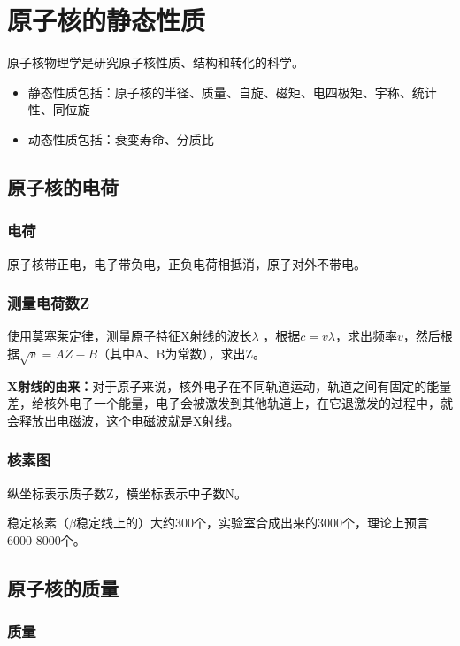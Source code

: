 \chapter{原子核的静态性质}

原子核物理学是研究原子核性质、结构和转化的科学。

\begin{itemize}
    \item 静态性质包括：原子核的半径、质量、自旋、磁矩、电四极矩、宇称、统计性、同位旋
    \item 动态性质包括：衰变寿命、分质比
\end{itemize}

\section{原子核的电荷} 

\subsection{电荷} 
 
原子核带正电，电子带负电，正负电荷相抵消，原子对外不带电。

\subsection{测量电荷数Z}

使用莫塞莱定律，测量原子特征X射线的波长$\lambda$ ，根据$c=v\lambda$，求出频率$v$，然后根据$\sqrt{v}=AZ-B$（其中A、B为常数），求出Z。

\textbf{X射线的由来：}对于原子来说，核外电子在不同轨道运动，轨道之间有固定的能量差，给核外电子一个能量，电子会被激发到其他轨道上，在它退激发的过程中，就会释放出电磁波，这个电磁波就是X射线。

\subsection{核素图}

纵坐标表示质子数Z，横坐标表示中子数N。

稳定核素（$\beta$稳定线上的）大约300个，实验室合成出来的3000个，理论上预言6000-8000个。

\section{原子核的质量}

\subsection{质量}

